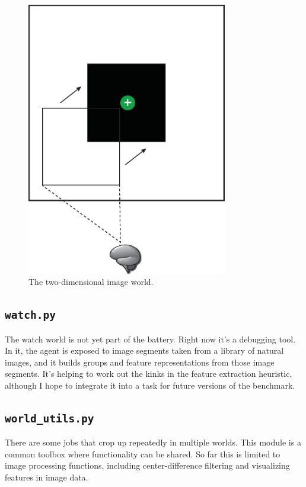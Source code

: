 \begin{figure}
\centering
\includegraphics[height=12cm]{figs/image_world_2D.eps}
\caption{The two-dimensional image world.}
\label{image_2D}
\end{figure}


\subsection{\texttt{watch.py}}

The watch world is not yet part of the battery. Right now it's a debugging tool. In it, the agent is exposed to image segments taken from a library of natural images, and it builds groups and feature representations from those image segments. It's helping to work out the kinks in the feature extraction heuristic, although I hope to integrate it into a task for future versions of the benchmark.


\subsection{\texttt{world\_utils.py}}

There are some jobs that crop up repeatedly in multiple worlds. This module is a common toolbox where functionality can be shared. So far this is limited to image processing functions, including center-difference filtering and visualizing features in image data.

